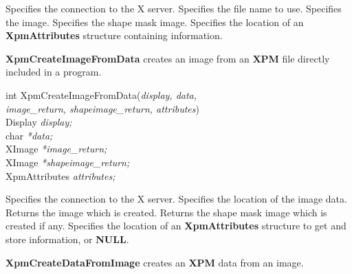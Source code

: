 \begin{description}

 Specifies the connection to the X server.
 Specifies the file name to use.
 Specifies the image.
 Specifies the shape mask image.
 Specifies the location of an {\bf XpmAttributes} structure
containing information.

\end{description} 

\vspace{.5cm}
{\bf XpmCreateImageFromData} creates an image from an {\bf XPM} file directly included in a program.

\begin{flushleft} 

int XpmCreateImageFromData({\it display, data, \\
\hspace{3cm}image\_return, shapeimage\_return, attributes})\\

\hspace{1cm}Display {\it *display;}\\
\hspace{1cm}char {\it **data;}\\
\hspace{1cm}XImage {\it **image\_return;}\\
\hspace{1cm}XImage {\it **shapeimage\_return;}\\
\hspace{1cm}XpmAttributes {\it *attributes;}

\end{flushleft}

\begin{description}

 Specifies the connection to the X server.
 Specifies the location of the image data.
 Returns the image which is created.
 Returns the shape mask image which is created if
any.
 Specifies the location of an {\bf XpmAttributes} structure
to get and store information, or {\bf NULL}. 

\end{description} 

\vspace{.5cm}
{\bf XpmCreateDataFromImage} creates an {\bf XPM} data from an image.


